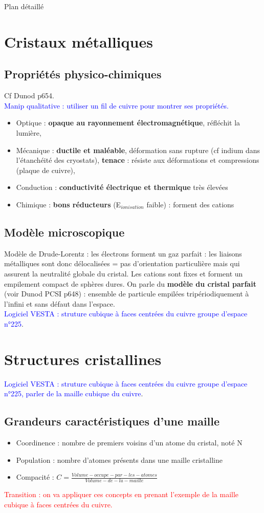 \begin{reportBlock}{Plan détaillé}
\section{Cristaux métalliques}
\subsection{Propriétés physico-chimiques}
Cf Dunod p654.\\
\textcolor{blue}{Manip qualitative : utiliser un fil de cuivre pour montrer ses propriétés.}
\begin{itemize}
    \item Optique : \textbf{opaque au rayonnement électromagnétique}, réfléchit la lumière,
    \item Mécanique :  \textbf{ductile et maléable}, déformation sans rupture (cf indium dans l'étanchéité des cryostats),  \textbf{tenace} : résiste aux déformations et compressions (plaque de cuivre),
    \item Conduction : \textbf{conductivité électrique et thermique} très élevées
    \item Chimique : \textbf{bons réducteurs} (E$_{ionisation}$ faible) : forment des cations
\end{itemize}

\subsection{Modèle microscopique}
Modèle de Drude-Lorentz : les électrons forment un gaz parfait : les liaisons métalliques sont donc délocalisées = pas d'orientation particulière mais qui assurent la neutralité globale du cristal. Les cations sont fixes et forment un empilement compact de sphères dures. On parle du \textbf{modèle du cristal parfait} (voir Dunod PCSI p648) : ensemble de particule empilées tripériodiquement à l'infini et sans défaut dans l'espace.\\
\textcolor{blue}{Logiciel VESTA : struture cubique à faces centrées du cuivre groupe d'espace n°225}.

\section{Structures cristallines}
\textcolor{blue}{Logiciel VESTA : struture cubique à faces centrées du cuivre groupe d'espace n°225, parler de la maille cubique du cuivre}.
\subsection{Grandeurs caractéristiques d'une maille}
\begin{itemize}
    \item Coordinence : nombre de premiers voisins d'un atome du cristal, noté N
    \item Population : nombre d'atomes présents dans une maille cristalline
    \item Compacité : $C=\frac{Volume-occupe-par-les-atomes}{Volume-de-la-maille}$
\end{itemize}
\textcolor{red}{Transition : on va appliquer ces concepts en prenant l'exemple de la maille cubique à faces centrées du cuivre.}

\end{reportBlock}
